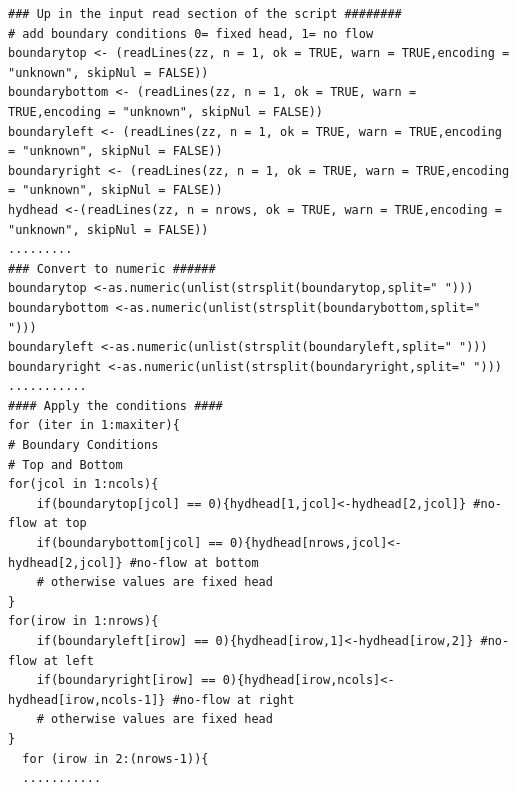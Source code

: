 \begin{lstlisting}[caption= Script fragments for implementing generalized boundary conditions , label=lst:BoundaryMask]
### Up in the input read section of the script ########
# add boundary conditions 0= fixed head, 1= no flow
boundarytop <- (readLines(zz, n = 1, ok = TRUE, warn = TRUE,encoding = "unknown", skipNul = FALSE))
boundarybottom <- (readLines(zz, n = 1, ok = TRUE, warn = TRUE,encoding = "unknown", skipNul = FALSE))
boundaryleft <- (readLines(zz, n = 1, ok = TRUE, warn = TRUE,encoding = "unknown", skipNul = FALSE))
boundaryright <- (readLines(zz, n = 1, ok = TRUE, warn = TRUE,encoding = "unknown", skipNul = FALSE))
hydhead <-(readLines(zz, n = nrows, ok = TRUE, warn = TRUE,encoding = "unknown", skipNul = FALSE))
.........
### Convert to numeric ######
boundarytop <-as.numeric(unlist(strsplit(boundarytop,split=" ")))
boundarybottom <-as.numeric(unlist(strsplit(boundarybottom,split=" ")))
boundaryleft <-as.numeric(unlist(strsplit(boundaryleft,split=" ")))
boundaryright <-as.numeric(unlist(strsplit(boundaryright,split=" ")))
...........
#### Apply the conditions ####
for (iter in 1:maxiter){
# Boundary Conditions
# Top and Bottom
for(jcol in 1:ncols){
    if(boundarytop[jcol] == 0){hydhead[1,jcol]<-hydhead[2,jcol]} #no-flow at top
    if(boundarybottom[jcol] == 0){hydhead[nrows,jcol]<-hydhead[2,jcol]} #no-flow at bottom
    # otherwise values are fixed head
}
for(irow in 1:nrows){
    if(boundaryleft[irow] == 0){hydhead[irow,1]<-hydhead[irow,2]} #no-flow at left
    if(boundaryright[irow] == 0){hydhead[irow,ncols]<-hydhead[irow,ncols-1]} #no-flow at right
    # otherwise values are fixed head
}
  for (irow in 2:(nrows-1)){ 
  ...........
  
\end{lstlisting}

